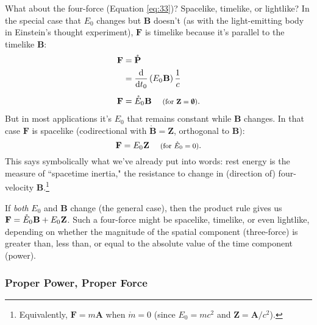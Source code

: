 \documentclass[12pt]{article}
\renewcommand{\vv}[1]{\mathbf{#1}}
\newcommand{\dd}[1]{\mathrm{d}#1}
\begin{document}
What about the four-force (Equation \ref{eq:33})? Spacelike, timelike, or lightlike? In the special case that $E_0$ changes but $\vv B$ doesn't (as with the light-emitting body in Einstein's thought experiment), $\vv F$ is timelike because it's parallel to the timelike $\vv B$:
\begin{equation}\label{eq:38}
\begin{split}
\vv F &= \mathring{\vv P}\\
&= \frac{\dd}{\dd t_0} \left( E_0 \mkern.5mu \vv B \right) \frac{1}{c}\\[5pt]
\vv F &= \mathring E_0 \mkern.5mu \vv B \quad \textrm{\footnotesize{ (for $\vv Z = \textrm{\mbox{\boldmath $\emptyset$}}$)}}.
\end{split}
\end{equation}
But in most applications it's $E_0$ that remains constant while $\vv B$ changes. In that case $\vv F$ is spacelike (codirectional with $\mathring{\vv B} = \vv Z$, orthogonal to $\vv B$):
\begin{equation}\label{eq:39}
\vv F = E_0 \mkern.5mu \vv Z \quad \textrm{\footnotesize{ (for $\mathring{E}_0 = 0$)}}.
\end{equation}
This says symbolically what we've already put into words: rest energy is the measure of ``spacetime inertia," the resistance to change in (direction of) four-velocity $\vv B$.\footnote{Equivalently, $\vv F = m \vv A$ when $\mathring{m} = 0$ (since $E_0 = mc^2$ and $\vv Z = \vv A / c^2$).}

If \emph{both} $E_0$ and $\vv B$ change (the general case), then the product rule gives us $\vv F = \mathring E_0 \mkern.5mu \vv B + E_0 \mkern.5mu \vv Z$. Such a four-force might be spacelike, timelike, or even lightlike, depending on whether the magnitude of the spatial component (three-force) is greater than, less than, or equal to the absolute value of the time component (power).

\subsubsection{Proper Power, Proper Force}\label{sssec:pf}
\end{document}

